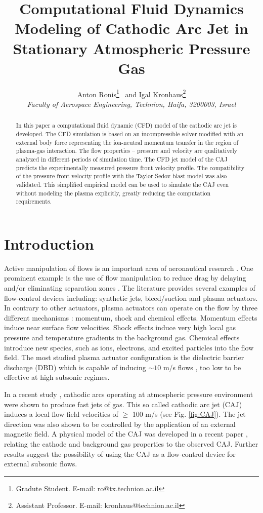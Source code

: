 \documentclass[a4paper]{iacas}%
\title{Computational Fluid Dynamics Modeling of Cathodic Arc Jet in Stationary Atmospheric Pressure Gas}
\author{%
	Anton Ronis\thanks{Gradute Student. E-mail: ro@tx.technion.ac.il}
	\ and
	Igal Kronhaus\thanks{Assistant Professor. E-mail: kronhaus@technion.ac.il}\\
	{\normalsize\itshape
		Faculty of Aerospace Engineering, Technion, Haifa,
		3200003, Israel}
}
\begin{document}
	
	\maketitle
	
	\begin{abstract}
		In this paper a computational fluid dynamic (CFD) model of the cathodic arc jet is developed. The CFD simulation is based on an incompressible solver modified with an external body force representing the ion-neutral momentum transfer in the region of plasma-gas interaction.
		The flow properties -- pressure and velocity are qualitatively analyzed in different periods of simulation time. 
		The CFD jet model of the CAJ predicts the experimentally measured pressure front velocity profile. The compatibility of the pressure front velocity profile with the Taylor-Sedov blast model was also validated. This simplified empirical model can be used to simulate the CAJ even without modeling the plasma explicitly, greatly reducing the computation requirements.
		 
	\end{abstract}

\section{Introduction}
Active manipulation of flows is an important area of aeronautical research \cite{GADEL}. One prominent example is the use of flow manipulation to reduce drag by delaying and/or eliminating separation zones \cite{SIMPSON}. The literature provides several examples of flow-control devices including: synthetic jets, bleed/suction and plasma actuators.
In contrary to other actuators, plasma actuators can operate on the flow by three different mechanisms \cite{FLOWCTRL}: momentum, shock and chemical effects. Momentum effects induce near surface flow velocities. Shock effects induce very high local gas pressure and temperature gradients in the background gas. Chemical effects introduce new species, such as ions, electrons, and excited particles into the flow field. The most studied plasma actuator configuration is the dielectric barrier discharge (DBD) which is capable of inducing $\sim10$ m/s flows \cite{FLOWCTRL,KOK,WHALLEY,MOREAU}, too low to be effective at high subsonic regimes.

In a recent study \cite{KR}, cathodic arcs operating at atmospheric pressure environment were shown to produce fast jets of gas. This so called cathodic arc jet (CAJ) induces a local flow field velocities of $\ge$ 100 m/s (see Fig. \ref{fig:CAJ}). The jet direction was also shown to be controlled by the application of an external magnetic field. A physical model of the CAJ was developed in a recent paper \cite{KRClose}, relating the cathode and background gas properties to the observed CAJ. Further results suggest the possibility of using the CAJ as a flow-control device for external subsonic flows\cite{KRFar}.
\end{document}
